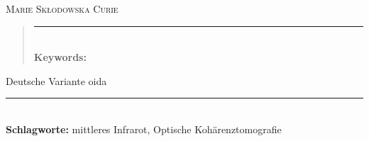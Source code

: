 \documentclass[
12pt, %
nolistspacing, %
liststotoc, %
headsepline, %
consistentlayout, %
]{MastersDoctoralThesis} %
\begin{document}
\hfill \textsc{Marie Skłodowska Curie}


\begin{abstract}
\singlespacing

\lipsum[1-4]

\vfill
\begin{flushleft}
\rule{\textwidth}{0.8pt}\\
\noindent \normalsize \textbf{Keywords:} \keywordnames
\end{flushleft}
\clearpage
\end{abstract}


\begin{otherlanguage}{ngerman}
\begin{kurzfassung}
\singlespacing

Deutsche Variante oida

\lipsum[1-3]



\begin{flushleft}
\rule{\textwidth}{0.8pt}\\
\noindent \normalsize \textbf{Schlagworte:} mittleres Infrarot, Optische Kohärenztomografie

\end{flushleft}
\clearpage
\end{kurzfassung}
\end{otherlanguage}



\begin{acknowledgements}
\vspace{15pt}
\singlespacing
\lipsum[1-3]
\end{acknowledgements}

\end{document}
